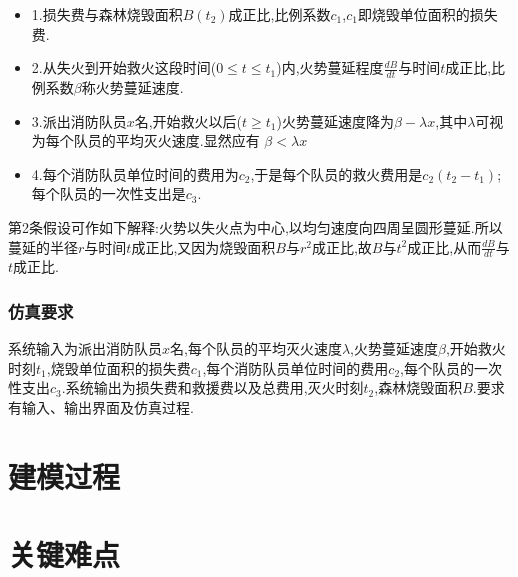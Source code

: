 \documentclass[UTF8]{article}
\begin{document}
        \begin{itemize}
            \item[]
            1.损失费与森林烧毁面积$B(t_2)$成正比,比例系数$c_1$,$c_1$即烧毁单位面积的损失费.

            \item[]
            2.从失火到开始救火这段时间($0 \leqslant t \leqslant t_1$)内,火势蔓延程度$\frac{dB}{dt}$与时间$t$成正比,比例系数$\beta$称火势蔓延速度.

            \item[]
            3.派出消防队员$x$名,开始救火以后($t \geqslant t_1$)火势蔓延速度降为$\beta - \lambda x$,其中$\lambda$可视为每个队员的平均灭火速度.显然应有 $\beta < \lambda x$

            \item[]
            4.每个消防队员单位时间的费用为$c_2$,于是每个队员的救火费用是$c_2(t_2-t_1)$;每个队员的一次性支出是$c_3$.
        \end{itemize}


        第2条假设可作如下解释:火势以失火点为中心,以均匀速度向四周呈圆形蔓延.所以蔓延的半径$r$与时间$t$成正比,又因为烧毁面积$B$与$r^2$成正比,故$B$与$t^2$成正比,从而$\frac{dB}{dt}$与$t$成正比.

    \subsubsection{仿真要求}
        
        系统输入为派出消防队员$x$名,每个队员的平均灭火速度$\lambda$,火势蔓延速度$\beta$,开始救火时刻$t_1$,烧毁单位面积的损失费$c_1$,每个消防队员单位时间的费用$c_2$,每个队员的一次性支出$c_3$.系统输出为损失费和救援费以及总费用,灭火时刻$t_2$,森林烧毁面积$B$.要求有输入、输出界面及仿真过程.
        



    \section{建模过程}


    \section{关键难点}
\end{document}
